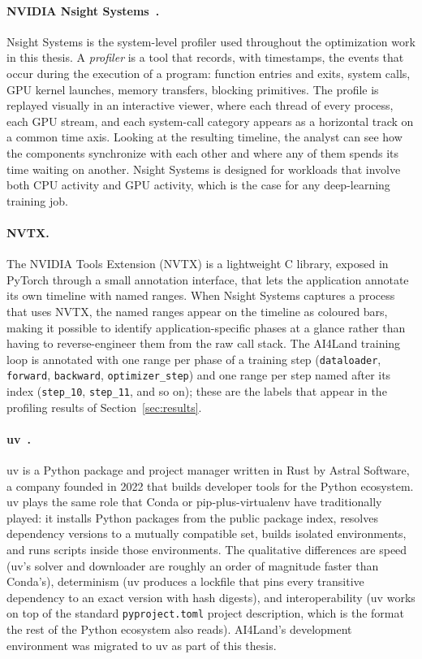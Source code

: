 \documentclass[12pt,a4paper]{article}
\begin{document}
\paragraph{NVIDIA Nsight Systems~\cite{nsight}.} Nsight Systems is the system-level profiler
used throughout the optimization work in this thesis. A \emph{profiler} is a tool that
records, with timestamps, the events that occur during the execution of a program: function
entries and exits, system calls, GPU kernel launches, memory transfers, blocking primitives.
The profile is replayed visually in an interactive viewer, where each thread of every process,
each GPU stream, and each system-call category appears as a horizontal track on a common time
axis. Looking at the resulting timeline, the analyst can see how the components synchronize
with each other and where any of them spends its time waiting on another. Nsight Systems is
designed for workloads that involve both CPU activity and GPU activity, which is the case
for any deep-learning training job.

\paragraph{NVTX.} The NVIDIA Tools Extension (NVTX) is a lightweight C library, exposed in
PyTorch through a small annotation interface, that lets the application annotate its own
timeline with named ranges. When Nsight Systems
captures a process that uses NVTX, the named ranges appear on the timeline as coloured bars,
making it possible to identify application-specific phases at a glance rather than having to
reverse-engineer them from the raw call stack. The AI4Land training loop is annotated with one
range per phase of a training step (\texttt{dataloader}, \texttt{forward}, \texttt{backward},
\texttt{optimizer\_step}) and one range per step named after its index (\texttt{step\_10},
\texttt{step\_11}, and so on); these are the labels that appear in the profiling results of
Section~\ref{sec:results}.

\paragraph{uv~\cite{uv}.} uv is a Python package and project manager written in Rust by
Astral Software, a company founded in 2022 that builds developer tools for the Python
ecosystem. uv plays the same role that Conda or pip-plus-virtualenv have traditionally
played: it installs Python packages from the public package index, resolves dependency
versions to a mutually compatible set, builds isolated environments, and runs scripts inside
those environments. The qualitative differences are speed (uv's solver and downloader are
roughly an order of magnitude faster than Conda's), determinism (uv produces a lockfile that
pins every transitive dependency to an exact version with hash digests), and interoperability
(uv works on top of the standard \texttt{pyproject.toml} project description, which is the
format the rest of the Python ecosystem also reads). AI4Land's development environment was
migrated to uv as part of this thesis.
\end{document}
